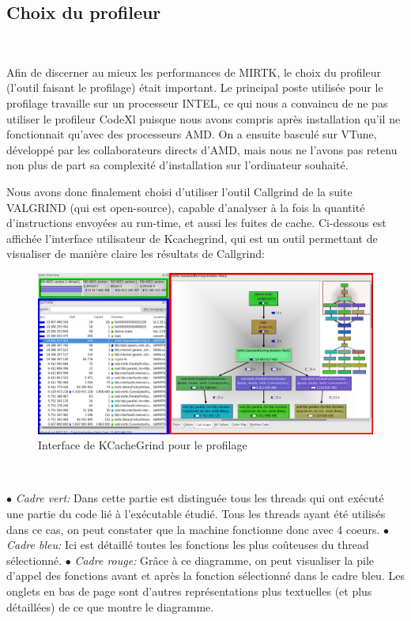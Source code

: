 \documentclass[10pt]{report}
\begin{document}
	\subsection{Choix du profileur}~\par
	Afin de discerner au mieux les performances de MIRTK, le choix du profileur (l'outil faisant le profilage) était important. Le principal poste utilisée pour le profilage travaille sur un processeur INTEL, ce qui nous a convaincu de ne pas utiliser le profileur CodeXl puisque nous avons compris après installation qu'il ne fonctionnait qu'avec des processeurs AMD. On a ensuite basculé sur VTune, développé par les collaborateurs directs d'AMD, mais nous ne l'avons pas retenu non plus de part sa complexité d'installation sur l'ordinateur souhaité.
	
	Nous avons donc finalement choisi d'utiliser l'outil Callgrind de la suite VALGRIND (qui est open-source), capable d'analyser à la fois la quantité d'instructions envoyées au run-time, et aussi les fuites de cache.
	Ci-dessous est affichée l'interface utilisateur de Kcachegrind, qui est un outil permettant de visualiser de manière claire les résultats de Callgrind:
	\begin{figure}[h!]
		\begin{center}
			\includegraphics[width=13cm]{Reports/figures/UIkcachegrind.png}
		\end{center}	
		\caption{Interface de KCacheGrind pour le profilage}
		\label{Interface de KCacheGrind pour le profilage}
	\end{figure}~\par
	{$\bullet$} \textit{Cadre vert: } Dans cette partie est distinguée tous les threads qui ont exécuté une partie du code lié à l'exécutable étudié. Tous les threads ayant été utilisés dans ce cas, on peut constater que la machine fonctionne donc avec 4 coeurs. \newline
	{$\bullet$} \textit{Cadre bleu: } Ici est détaillé toutes les fonctions les plus coûteuses du thread sélectionné. \newline
	{$\bullet$} \textit{Cadre rouge: } Grâce à ce diagramme, on peut visualiser la pile d'appel des fonctions avant et après la fonction sélectionné dans le cadre bleu. Les onglets en bas de page sont d'autres représentations plus textuelles (et plus détaillées) de ce que montre le diagramme. \newline
	
\end{document}
